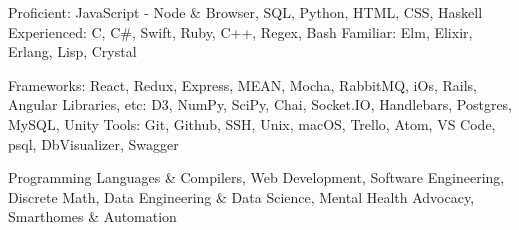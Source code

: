 \begin{cvhonors}
  \cvhonor
    {Proficient:}
    {JavaScript - Node \& Browser, SQL, Python, HTML, CSS, Haskell}
    {}
  \cvhonor
    {Experienced:}
    {C, C\#, Swift, Ruby, C++, Regex, Bash}
    {}
  \cvhonor
    {Familiar:}
    {Elm, Elixir, Erlang, Lisp, Crystal}
    {}
\end{cvhonors}

\begin{cvhonors}
  \cvhonor
    {Frameworks:}
    {React, Redux, Express, MEAN, Mocha, RabbitMQ, iOs, Rails, Angular}
    {}
  \cvhonor
    {Libraries, etc:}
    {D3, NumPy, SciPy, Chai, Socket.IO, Handlebars, Postgres, MySQL, Unity}
    {}
  \cvhonor
    {Tools:}
    {Git, Github, SSH, Unix, macOS, Trello, Atom, VS Code, psql, DbVisualizer, Swagger}
    {}
\end{cvhonors}

\begin{cvhonors}
  \cvhonor
    {}
    {Programming Languages \& Compilers, Web Development, Software Engineering, Discrete Math, Data Engineering \& Data Science, Mental Health Advocacy, Smarthomes \& Automation}
    {}
\end{cvhonors}